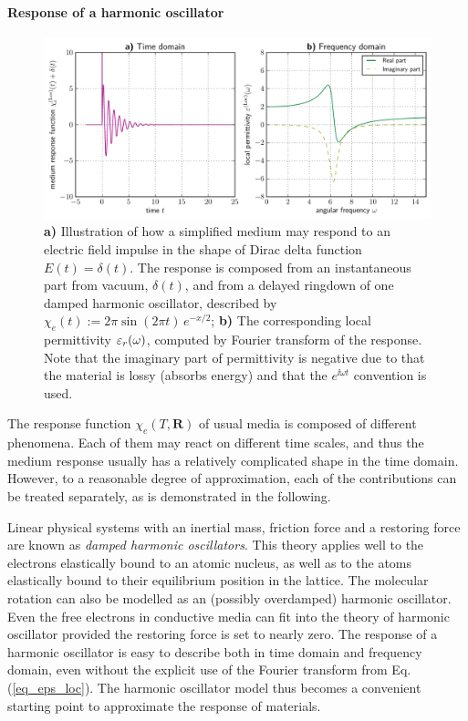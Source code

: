 \paragraph{Response of a harmonic oscillator} \label{chap_lorentzmedia} %
\begin{figure}[t] \caption{\textbf{a)} Illustration of how a simplified medium may respond to an electric field impulse in the shape of Dirac delta function  $E(t) = \delta(t)$. The response is composed from an instantaneous part from vacuum, $\delta(t)$, and from a delayed ringdown of one damped harmonic oscillator, described by $\chi_e(t) := 2\pi \sin(2\pi t)\,e^{-x/2}$; \textbf{b)} The corresponding local permittivity $\varepsilon_r(\omega)$, computed by Fourier transform of the response. Note that the imaginary part of permittivity is negative due to that the material is lossy (absorbs energy) and that the $e^{\ii\omega t}$ convention is used.} \label{fg_oscillator_spectrum} \centering 
	\includegraphics[width=17cm]{img/oscillator_spectrum.pdf}
\end{figure}
The response function $\chi_e(T, \mathbf{R})$ of usual media is composed of different phenomena.  Each of them may react on different time scales, and thus the medium response usually has a relatively complicated shape in the time domain.  However, to a reasonable degree of approximation, each of the contributions can be treated separately, as is demonstrated in the following.

Linear physical systems with an inertial mass, friction force and a restoring force are known as \textit{damped harmonic oscillators}.  This theory applies well to the electrons elastically bound to an atomic nucleus, as well as to the atoms elastically bound to their equilibrium position in the lattice. The molecular rotation can also be modelled as an (possibly overdamped) harmonic oscillator. Even the free electrons in conductive media can fit into the theory of harmonic oscillator provided the restoring force is set to nearly zero. The response of a harmonic oscillator is easy to describe both in time domain and frequency domain, even without the explicit use of the Fourier transform from Eq. (\ref{eq_eps_loc}). The harmonic oscillator model thus becomes a convenient starting point to approximate the response of materials.

